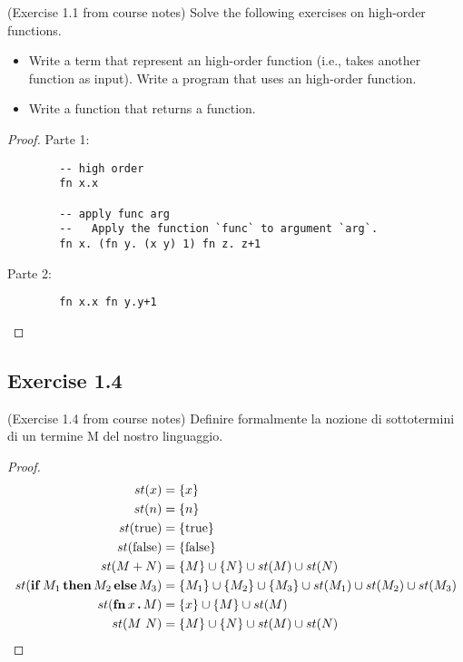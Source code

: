 \documentclass[12pt,a4paper,oneside]{book}
\begin{document}
\begin{exercise}{(Exercise 1.1 from course notes)}
    Solve the following exercises on high-order functions.
    \begin{itemize}
        \item Write a term that represent an high-order function
          (i.e., takes another function as input). Write a program that uses an high-order function.
        \item Write a function that returns a function.
    \end{itemize}

	\begin{proof}
	    Parte 1:
	    \begin{verbatim}
	    -- high order
	    fn x.x
	
	    -- apply func arg
	    --   Apply the function `func` to argument `arg`.
	    fn x. (fn y. (x y) 1) fn z. z+1
	    \end{verbatim}
	
	    Parte 2:
	    \begin{verbatim}
	    fn x.x fn y.y+1
	    \end{verbatim}
	\end{proof}
\end{exercise}

\subsection{Exercise 1.4}

\begin{exercise}{(Exercise 1.4 from course notes)}
    Definire formalmente la nozione di sottotermini di un termine M
    del nostro linguaggio.
    \begin{proof}
        \begin{equation}
        	\begin{split}
	        	st(x) &= \{ x \}\\
	        	st(n) &= \{ n \}\\
	        	st(\mathrm{true}) &= \{ \mathrm{true} \}\\
	        	st(\mathrm{false}) &= \{ \mathrm{false} \}\\
	        	st(M + N) &= \{ M \} \cup \{ N \} \cup st(M) \cup st(N)\\
	        	st(\mathop{\textup{\textbf{if}}} M_1 \mathop{\textup{\textbf{then}}} M_2 \mathop{\textup{\textbf{else}}} M_3) &= \{ M_1 \} \cup \{ M_2 \} \cup \{ M_3 \} \cup st(M_1) \cup st(M_2) \cup st(M_3)\\
	        	st(\mathop{\textup{\textbf{fn}}} x \mathop{\textup{\textbf{.}}} M) &= \{ x \} \cup \{ M \} \cup st(M)\\
	        	st(M\ N) &= \{ M \} \cup \{ N \} \cup st(M) \cup st(N)\\
        	\end{split}
        \end{equation}
    \end{proof}
\end{exercise}
\end{document}
